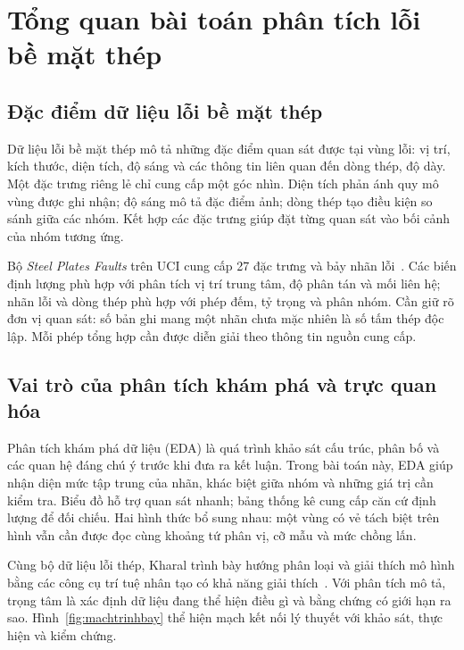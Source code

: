 \documentclass[12pt,a4paper,oneside]{report}
\begin{document}
\section{Tổng quan bài toán phân tích lỗi bề mặt thép}
\label{sec:tongquan}

\subsection{Đặc điểm dữ liệu lỗi bề mặt thép}

Dữ liệu lỗi bề mặt thép mô tả những đặc điểm quan sát được tại vùng lỗi: vị trí, kích thước, diện tích, độ sáng và các thông tin liên quan đến dòng thép, độ dày. Một đặc trưng riêng lẻ chỉ cung cấp một góc nhìn. Diện tích phản ánh quy mô vùng được ghi nhận; độ sáng mô tả đặc điểm ảnh; dòng thép tạo điều kiện so sánh giữa các nhóm. Kết hợp các đặc trưng giúp đặt từng quan sát vào bối cảnh của nhóm tương ứng.

Bộ \textit{Steel Plates Faults} trên UCI cung cấp 27 đặc trưng và bảy nhãn lỗi~\cite{uci}. Các biến định lượng phù hợp với phân tích vị trí trung tâm, độ phân tán và mối liên hệ; nhãn lỗi và dòng thép phù hợp với phép đếm, tỷ trọng và phân nhóm. Cần giữ rõ đơn vị quan sát: số bản ghi mang một nhãn chưa mặc nhiên là số tấm thép độc lập. Mỗi phép tổng hợp cần được diễn giải theo thông tin nguồn cung cấp.

\subsection{Vai trò của phân tích khám phá và trực quan hóa}

Phân tích khám phá dữ liệu (EDA) là quá trình khảo sát cấu trúc, phân bố và các quan hệ đáng chú ý trước khi đưa ra kết luận. Trong bài toán này, EDA giúp nhận diện mức tập trung của nhãn, khác biệt giữa nhóm và những giá trị cần kiểm tra. Biểu đồ hỗ trợ quan sát nhanh; bảng thống kê cung cấp căn cứ định lượng để đối chiếu. Hai hình thức bổ sung nhau: một vùng có vẻ tách biệt trên hình vẫn cần được đọc cùng khoảng tứ phân vị, cỡ mẫu và mức chồng lấn.

Cùng bộ dữ liệu lỗi thép, Kharal trình bày hướng phân loại và giải thích mô hình bằng các công cụ trí tuệ nhân tạo có khả năng giải thích~\cite{kharal}. Với phân tích mô tả, trọng tâm là xác định dữ liệu đang thể hiện điều gì và bằng chứng có giới hạn ra sao. Hình~\ref{fig:machtrinhbay} thể hiện mạch kết nối lý thuyết với khảo sát, thực hiện và kiểm chứng.
\end{document}
